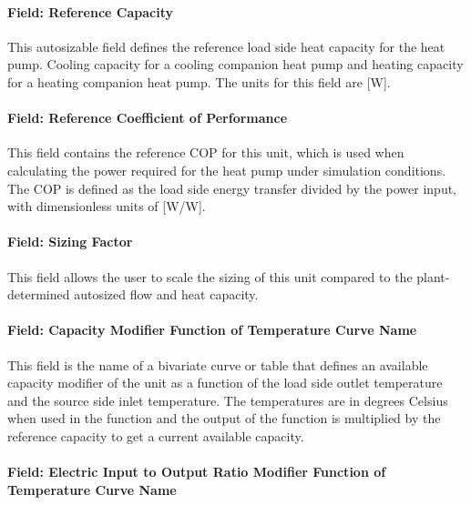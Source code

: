\paragraph{Field: Reference Capacity}\label{plhp_eir_inputs_reference_capacity}

This autosizable field defines the reference load side heat capacity for the heat pump.  Cooling capacity for a cooling companion heat pump and heating capacity for a heating companion heat pump.  The units for this field are [W].

\paragraph{Field: Reference Coefficient of Performance}\label{plhp_eir_inputs_reference_cop}

This field contains the reference COP for this unit, which is used when calculating the power required for the heat pump under simulation conditions.  The COP is defined as the load side energy transfer divided by the power input, with dimensionless units of [W/W].

\paragraph{Field: Sizing Factor}\label{plhp_eir_inputs_sizing_factor}

This field allows the user to scale the sizing of this unit compared to the plant-determined autosized flow and heat capacity.

\paragraph{Field: Capacity Modifier Function of Temperature Curve Name}\label{plhp_eir_inputs_capft}

This field is the name of a bivariate curve or table that defines an available capacity modifier of the unit as a function of the load side outlet temperature and the source side inlet temperature.  The temperatures are in degrees Celsius when used in the function and the output of the function is multiplied by the reference capacity to get a current available capacity.

\paragraph{Field: Electric Input to Output Ratio Modifier Function of Temperature Curve Name}\label{plhp_eir_inputs_eirft}

